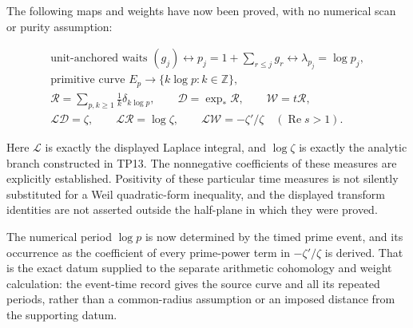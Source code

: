 \documentclass[
]{article}
\begin{document}
The following maps and weights have now been proved, with no numerical
scan or purity assumption:

\[
\begin{gathered}
\text{unit-anchored waits }(g_j)
\longleftrightarrow p_j=1+\sum_{r\le j}g_r
\longleftrightarrow \lambda_{p_j}=\log p_j,\\
\text{primitive curve }E_p
\longrightarrow \{k\log p:k\in\mathbb Z\},\\
\mathcal R=\sum_{p,k\ge1}\frac1k\delta_{k\log p},
\qquad
\mathcal D=\exp_*\mathcal R,
\qquad
\mathcal W=t\mathcal R,\\
\mathcal L\mathcal D=\zeta,
\qquad
\mathcal L\mathcal R=\log\zeta,
\qquad
\mathcal L\mathcal W=-\zeta'/\zeta
\quad(\operatorname{Re}s>1).
\end{gathered}
\]

Here \(\mathcal L\) is exactly the displayed Laplace integral, and
\(\log\zeta\) is exactly the analytic branch constructed in TP13. The
nonnegative coefficients of these measures are explicitly established.
Positivity of these particular time measures is not silently substituted
for a Weil quadratic-form inequality, and the displayed transform
identities are not asserted outside the half-plane in which they were
proved.

The numerical period \(\log p\) is now determined by the timed prime
event, and its occurrence as the coefficient of every prime-power term
in \(-\zeta'/\zeta\) is derived. That is the exact datum supplied to the
separate arithmetic cohomology and weight calculation: the event-time
record gives the source curve and all its repeated periods, rather than
a common-radius assumption or an imposed distance from the supporting
datum.
\end{document}
